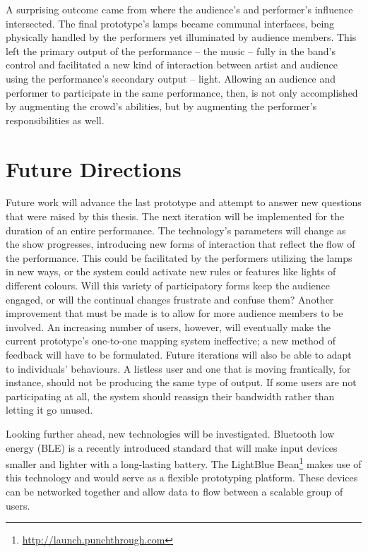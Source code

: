A surprising outcome came from where the audience's and performer's influence intersected. The final prototype's lamps became communal interfaces, being physically handled by the performers yet illuminated by audience members. This left the primary output of the performance -- the music -- fully in the band's control and facilitated a new kind of interaction between artist and audience using the performance's secondary output -- light. Allowing an audience and performer to participate in the same performance, then, is not only accomplished by augmenting the crowd's abilities, but by augmenting the performer's responsibilities as well.


\section{Future Directions}


Future work will advance the last prototype and attempt to answer new questions that were raised by this thesis. The next iteration will be implemented for the duration of an entire performance. The technology's parameters will change as the show progresses, introducing new forms of interaction that reflect the flow of the performance. This could be facilitated by the performers utilizing the lamps in new ways, or the system could activate new rules or features like lights of different colours. Will this variety of participatory forms keep the audience engaged, or will the continual changes frustrate and confuse them? Another improvement that must be made is to allow for more audience members to be involved. An increasing number of users, however, will eventually make the current prototype's one-to-one mapping system ineffective; a new method of feedback will have to be formulated. Future iterations will also be able to adapt to individuals' behaviours. A listless user and one that is moving frantically, for instance, should not be producing the same type of output. If some users are not participating at all, the system should reassign their bandwidth rather than letting it go unused.

Looking further ahead, new technologies will be investigated. Bluetooth low energy (BLE) is a recently introduced standard that will make input devices smaller and lighter with a long-lasting battery. The LightBlue Bean\footnote{\url{http://launch.punchthrough.com}} makes use of this technology and would serve as a flexible prototyping platform. These devices can be networked together and allow data to flow between a scalable group of users.

